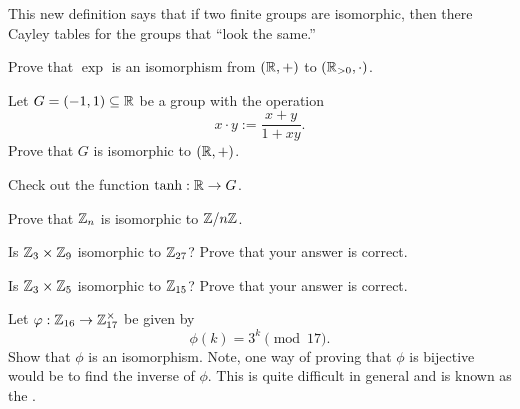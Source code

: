 \documentclass{ximera}
\begin{document}
This new definition says that if two finite groups are isomorphic,
then there Cayley tables for the groups that ``look the same.''

\begin{exercise}
  Prove that $\exp$ is an isomorphism from $(\mathbb R,+)$ to $(\mathbb R_{>
    0},\cdot)$.
\end{exercise}


\begin{exercise}
  Let $G = (-1,1)\subseteq \mathbb R$ be a group with the operation
  \[
  x\cdot y := \frac{x+y}{1+xy}.
  \]
  Prove that $G$ is isomorphic to $(\mathbb R,+)$.

  \begin{hint}
    Check out the function $\tanh: \mathbb R\to G$.
  \end{hint}
\end{exercise}

\begin{exercise}
  Prove that $\mathbb Z_n$ is isomorphic to $\mathbb Z/n\mathbb Z$.
\end{exercise}


\begin{exercise}
  Is $\mathbb Z_3\times \mathbb Z_9$ isomorphic to $\mathbb Z_{27}$? Prove that your answer
  is correct.
\end{exercise}

\begin{exercise}
  Is $\mathbb Z_3\times \mathbb Z_5$ isomorphic to $\mathbb Z_{15}$? Prove that your answer
  is correct.
\end{exercise}

\begin{exercise}
  Let $\varphi:\mathbb Z_{16}\to\mathbb Z_{17}^\times$ be given by
  \[
  \phi(k)= 3^k \pmod{17}.
  \]
  Show that $\phi$ is an isomorphism. Note, one way of proving that
  $\phi$ is bijective would be to find the inverse of $\phi$. This is
  quite difficult in general and is known as the .
\end{exercise}





\end{document}
